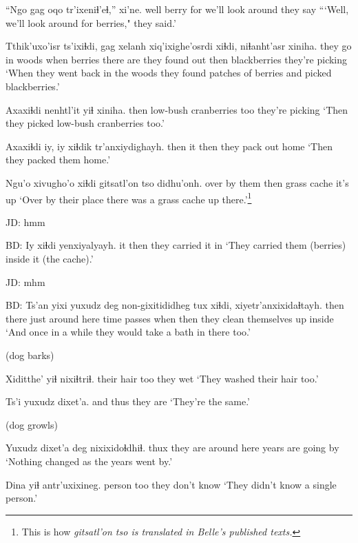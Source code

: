 \documentclass[12pt]{article}
\begin{document}
\gll ``Ngo  gag   oqo tr'ixeniɬ'eɬ,''      xi'ne.
well berry for {we'll look around} {they say}
\glt ```Well, we'll look around for berries," they said.'
\glend

\gll Tthik'uxo'isr    ts'ixiɬdi, gag xelanh        xiq'ixighe'osrdi xiɬdi, niɬanht'asr   xiniha.
{they go in woods} when  berries {there are} {they found out}   then blackberries  {they're picking}
\glt `When they went back in the woods they found patches of berries and picked blackberries.'
\glend

\gll Axaxiɬdi nenhtl'it     yiɬ xiniha.           
then     {low-bush cranberries} too {they're picking}  
\glt `Then they picked low-bush cranberries too.'
\glend

\gll Axaxiɬdi iy, iy xiɬdik tr'anxiydighayh.
then     {} it then   {they pack out home}
\glt `Then they packed them home.'
\glend

\gll Ngu'o xivugho'o xiɬdi gitsatl'on   tso   didhu'onh.
over  {by them}   then  {grass cache} {it's up}
\glt `Over by their place there was a grass cache up
there.'\footnote{This is how \em gitsatl'on tso \em is translated in Belle's published texts.}
\glend 

JD:  hmm

BD:
\gll Iy xiɬdi yenxiyalyayh.
it then  {they carried it in}
\glt `They carried them (berries) inside it (the cache).'
\glend

JD:  mhm

BD:
\gll Ts'an yixi  yuxudz deg non-gixitididheg tux  xiɬdi, xiyetr'anxixidaɬtayh.
then  there just {around here}  {time passes}          when then  {they clean themselves up inside}
\glt `And once in a while they would take a bath in there too.'
\glend

(dog barks)

\gll Xiditthe' yiɬ nixiɬtriɬ.
{their hair}            too {they wet}
\glt `They washed their hair too.'
\glend

\gll Ts'i yuxudz dixet'a. 
and    thus   {they are}
\glt `They're the same.'
\glend

(dog growls)

\gll Yuxudz dixet'a deg         nixixidoɬdhiɬ.
thux   {they are}    {around here} {years are going by}
\glt `Nothing changed as the years went by.'
\glend

\gll Dina yiɬ antr'uxixineg. 
person too {they don't know}
\glt `They didn't know a single person.'
\glend
\end{document}
